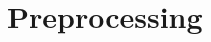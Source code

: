 \section{Preprocessing}


\begin{comment}
\section{Data Structures}
A Data structure is a way for computers to store, update and manipulate intermediate results.
A good data structure can efficiently speed up the access of the stored data,
which means the performance of solving our shortest path problem does not only depend on the algorithm it self but also the data structure.
In this project,
two data structures are combined to improve the solving speed:
\todo{idea of a data structure is unclear}
\begin{itemize}
\end{itemize}
\end{comment}

\begin{comment}
\subsection{Forward Star}\label{chap:forwardstar}
all arcs emanating from a given node need to be accessed.
An efficient way of visiting every node inside a network and access all their emanating arcs is to use the Forward Star data structure.
The advantage of using this data structure for storing the network is that
the time complexity for finding any node in the network and iterating through all the emanating arcs is $O(1)$.
The exact implementation of Forward Star is not going to be detailed in this report,
but the information can be found in Chapter 5.3 of Urban Transportation Networks \citep{Sheffi}.
This data structure has already been implemented by the second supervisor.
\end{comment}
